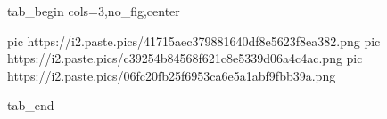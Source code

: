  
 
 
 
 


\ifcmt
  tab_begin cols=3,no_fig,center

     pic https://i2.paste.pics/41715aec379881640df8e5623f8ea382.png
		 pic https://i2.paste.pics/c39254b84568f621c8e5339d06a4c4ac.png
		 pic https://i2.paste.pics/06fc20fb25f6953ca6e5a1abf9fbb39a.png

  tab_end
\fi
